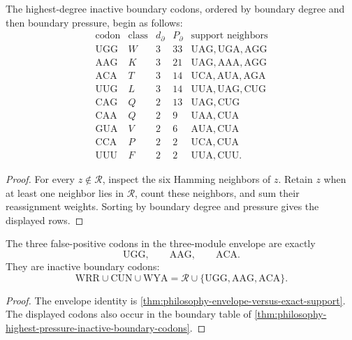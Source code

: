 \begin{theorem}
\label{thm:philosophy-highest-pressure-inactive-boundary-codons}
The highest-degree inactive boundary codons, ordered by boundary degree
and then boundary pressure, begin as follows:
$$
\begin{array}{c|c|c|c|c}
  \text{codon} & \text{class} & d_{\partial} & P_{\partial} & \text{support neighbors}\\
  \hline
  \mathrm{UGG} & W & 3 & 33 & \mathrm{UAG},\mathrm{UGA},\mathrm{AGG}\\
  \mathrm{AAG} & K & 3 & 21 & \mathrm{UAG},\mathrm{AAA},\mathrm{AGG}\\
  \mathrm{ACA} & T & 3 & 14 & \mathrm{UCA},\mathrm{AUA},\mathrm{AGA}\\
  \mathrm{UUG} & L & 3 & 14 & \mathrm{UUA},\mathrm{UAG},\mathrm{CUG}\\
  \mathrm{CAG} & Q & 2 & 13 & \mathrm{UAG},\mathrm{CUG}\\
  \mathrm{CAA} & Q & 2 & 9 & \mathrm{UAA},\mathrm{CUA}\\
  \mathrm{GUA} & V & 2 & 6 & \mathrm{AUA},\mathrm{CUA}\\
  \mathrm{CCA} & P & 2 & 2 & \mathrm{UCA},\mathrm{CUA}\\
  \mathrm{UUU} & F & 2 & 2 & \mathrm{UUA},\mathrm{CUU}.
\end{array}
$$
\end{theorem}
\begin{proof}
For every $z\notin\mathcal{R}$, inspect the six Hamming neighbors of
$z$. Retain $z$ when at least one neighbor lies in $\mathcal{R}$, count
these neighbors, and sum their reassignment weights. Sorting by
boundary degree and pressure gives the displayed rows.
\end{proof}

\begin{corollary}
\label{cor:philosophy-inactive-envelope-corners}
The three false-positive codons in the three-module envelope are exactly
$$
  \mathrm{UGG},\qquad \mathrm{AAG},\qquad \mathrm{ACA}.
$$
They are inactive boundary codons:
$$
  \mathrm{WRR}\cup\mathrm{CUN}\cup\mathrm{WYA}
  =
  \mathcal{R}\cup\{\mathrm{UGG},\mathrm{AAG},\mathrm{ACA}\}.
$$
\end{corollary}
\begin{proof}
The envelope identity is
\autoref{thm:philosophy-envelope-versus-exact-support}. The displayed
codons also occur in the boundary table of
\autoref{thm:philosophy-highest-pressure-inactive-boundary-codons}.
\end{proof}

